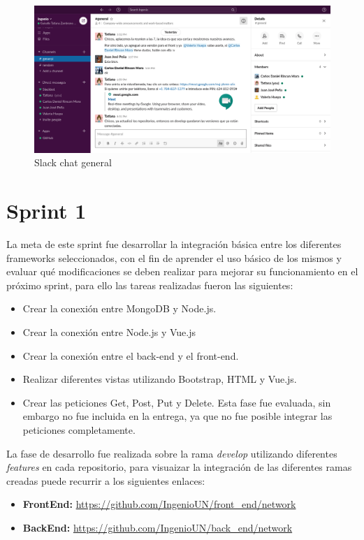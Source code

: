 \documentclass[a4paper,12 pt]{article}
\begin{document}
\begin{figure}[H]
    \centering
    \includegraphics[scale = 0.3]{images/slack_general.png}
    \caption{Slack chat general}
    \label{slack01}
\end{figure}{}

\section{Sprint 1}

La meta de este sprint fue desarrollar la integración básica entre los
diferentes frameworks seleccionados, con el fin de aprender el uso básico de los
mismos y evaluar qué modificaciones se deben realizar para mejorar su
funcionamiento en el próximo sprint, para ello las tareas realizadas fueron las
siguientes:
\begin{itemize}
    \item Crear la conexión entre MongoDB y Node.js.
    \item Crear la conexión entre Node.js y Vue.js
    \item Crear la conexión entre el back-end y el front-end.
    \item Realizar diferentes vistas utilizando Bootstrap, HTML y Vue.js.
    \item Crear las peticiones Get, Post, Put y Delete. Esta fase fue evaluada,
    sin embargo no fue incluida en la entrega, ya que no fue posible integrar
    las peticiones completamente.
\end{itemize}{}

La fase de desarrollo fue realizada sobre la rama \textit{develop} utilizando
diferentes \textit{features} en cada repositorio, para visuaizar la integración
de las diferentes ramas creadas puede recurrir a los siguientes enlaces:

\begin{itemize}
    \item \textbf{FrontEnd:}
    \url{https://github.com/IngenioUN/front_end/network}
    \item \textbf{BackEnd:}
    \url{https://github.com/IngenioUN/back_end/network}
\end{itemize}{}
\end{document}
